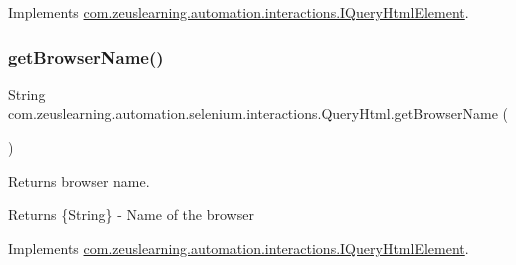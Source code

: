 Implements \hyperlink{interfacecom_1_1zeuslearning_1_1automation_1_1interactions_1_1IQueryHtmlElement_acd3892f7d74e247cf76dd5360fc7df49}{com.\+zeuslearning.\+automation.\+interactions.\+I\+Query\+Html\+Element}.

\hypertarget{classcom_1_1zeuslearning_1_1automation_1_1selenium_1_1interactions_1_1QueryHtml_a2a5f98d1135bb2e136ed1a6acef3f21f}{}\label{classcom_1_1zeuslearning_1_1automation_1_1selenium_1_1interactions_1_1QueryHtml_a2a5f98d1135bb2e136ed1a6acef3f21f} 
\subsubsection{\texorpdfstring{get\+Browser\+Name()}{getBrowserName()}}
{\footnotesize\ttfamily String com.\+zeuslearning.\+automation.\+selenium.\+interactions.\+Query\+Html.\+get\+Browser\+Name (\begin{DoxyParamCaption}{ }\end{DoxyParamCaption})\hspace{0.3cm}{\ttfamily [inline]}}

Returns browser name.

\begin{DoxyReturn}{Returns}
\{String\} -\/ Name of the browser 
\end{DoxyReturn}


Implements \hyperlink{interfacecom_1_1zeuslearning_1_1automation_1_1interactions_1_1IQueryHtmlElement_a4ec7d7e9291f5dfe81fdbb93217af747}{com.\+zeuslearning.\+automation.\+interactions.\+I\+Query\+Html\+Element}.

